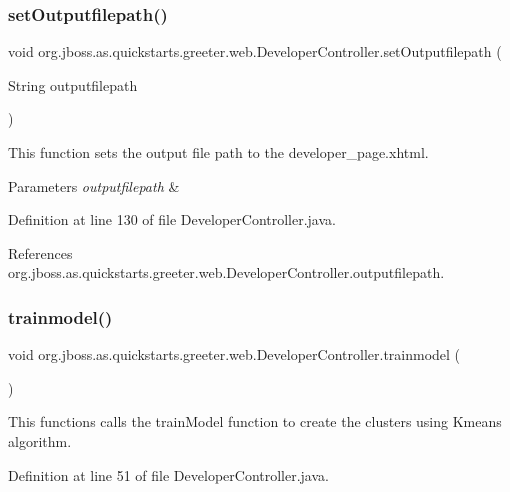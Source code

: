 \subsubsection{\texorpdfstring{set\+Outputfilepath()}{setOutputfilepath()}}
{\footnotesize\ttfamily void org.\+jboss.\+as.\+quickstarts.\+greeter.\+web.\+Developer\+Controller.\+set\+Outputfilepath (\begin{DoxyParamCaption}\item[{String}]{outputfilepath }\end{DoxyParamCaption})}

This function sets the output file path to the developer\+\_\+page.\+xhtml. 
\begin{DoxyParams}{Parameters}
{\em outputfilepath} & \\
\hline
\end{DoxyParams}


Definition at line 130 of file Developer\+Controller.\+java.



References org.\+jboss.\+as.\+quickstarts.\+greeter.\+web.\+Developer\+Controller.\+outputfilepath.

\mbox{\label{classorg_1_1jboss_1_1as_1_1quickstarts_1_1greeter_1_1web_1_1_developer_controller_af45acb1518af25aee3f532b1a04fc9f5}} 
\subsubsection{\texorpdfstring{trainmodel()}{trainmodel()}}
{\footnotesize\ttfamily void org.\+jboss.\+as.\+quickstarts.\+greeter.\+web.\+Developer\+Controller.\+trainmodel (\begin{DoxyParamCaption}{ }\end{DoxyParamCaption})}



This functions calls the train\+Model function to create the clusters using Kmeans algorithm. 



Definition at line 51 of file Developer\+Controller.\+java.



